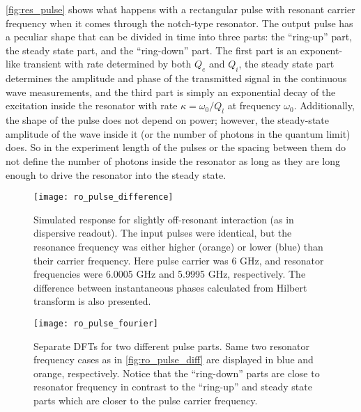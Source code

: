 \documentclass[12pt, twoside]{report}
\numberwithin{equation}{section}
\begin{document}
\autoref{fig:res_pulse} shows what happens with a rectangular pulse with resonant carrier frequency when it comes through the notch-type resonator. The output pulse has a peculiar shape that can be divided in time into three parts: the ``ring-up'' part, the steady state part, and the ``ring-down'' part. The first part is an exponent-like transient with rate determined by both $Q_e$ and $Q_i$, the steady state part  determines the amplitude and phase of the transmitted  signal in the continuous wave measurements, and the third part is simply an exponential decay of the excitation inside the resonator with rate $\kappa = \omega_0/Q_l$ at frequency $\omega_0$. Additionally, the shape of the pulse does not depend on power; however, the steady-state amplitude of the wave inside it (or the number of photons in the quantum limit) does. So in the experiment length of the pulses or the spacing between them do not define the number of photons inside the resonator as long as they are long enough to drive the resonator into the steady state.

\begin{figure}[h!]
\texttt{[image: ro\_pulse\_difference]}
\caption{Simulated response for slightly off-resonant interaction (as in dispersive readout). The input pulses were identical, but the resonance frequency was either higher (orange) or lower (blue) than their carrier frequency. Here pulse carrier was 6 GHz, and resonator frequencies were 6.0005 GHz and 5.9995 GHz, respectively. The difference between instantaneous phases calculated from Hilbert transform is also presented.}
\label{fig:ro_pulse_diff}
\end{figure}

\begin{figure}[h!]
\texttt{[image: ro\_pulse\_fourier]}
\caption{Separate DFTs for two different pulse parts. Same two resonator frequency cases as in \autoref{fig:ro_pulse_diff} are displayed in blue and orange, respectively. Notice that the ``ring-down'' parts are close to resonator frequency in contrast to the ``ring-up'' and steady state parts which are closer to the pulse carrier frequency.}
\end{figure}
\end{document}
